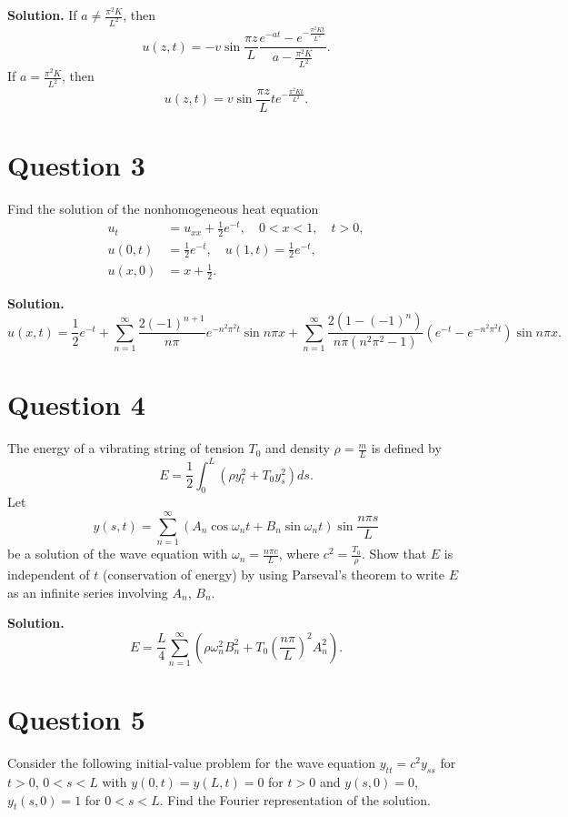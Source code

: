\documentclass[lang=en,11pt]{template}
\begin{document}
\textbf{Solution.} If $a \neq \frac{\pi^2 K}{L^2}$, then
\[
u(z,t) = -v \sin \frac{\pi z}{L} \frac{e^{-at} - e^{-\frac{\pi^2 K t}{L^2}}}{a - \frac{\pi^2 K}{L^2}}.
\]
If $a = \frac{\pi^2 K}{L^2}$, then
\[
u(z,t) = v \sin \frac{\pi z}{L} t e^{-\frac{\pi^2 K t}{L^2}}.
\]

\section*{Question 3}
Find the solution of the nonhomogeneous heat equation
\[
\begin{aligned}
u_t &= u_{xx} + \frac{1}{2} e^{-t}, \quad 0 < x < 1, \quad t > 0, \\
u(0,t) &= \frac{1}{2} e^{-t}, \quad u(1,t) = \frac{1}{2} e^{-t}, \\
u(x,0) &= x + \frac{1}{2}.
\end{aligned}
\]

\textbf{Solution.}
\[
u(x,t) = \frac{1}{2} e^{-t} + \sum_{n=1}^{\infty} \frac{2 (-1)^{n+1}}{n \pi} e^{-n^2 \pi^2 t} \sin n \pi x + \sum_{n=1}^{\infty} \frac{2 (1 - (-1)^n)}{n \pi (n^2 \pi^2 - 1)} \left( e^{-t} - e^{-n^2 \pi^2 t} \right) \sin n \pi x.
\]

\section*{Question 4}
The energy of a vibrating string of tension $T_0$ and density $\rho = \frac{m}{L}$ is defined by
\[
E = \frac{1}{2} \int_0^L \left( \rho y_t^2 + T_0 y_s^2 \right) ds.
\]
Let
\[
y(s,t) = \sum_{n=1}^{\infty} \left( A_n \cos \omega_n t + B_n \sin \omega_n t \right) \sin \frac{n \pi s}{L}
\]
be a solution of the wave equation with $\omega_n = \frac{n \pi c}{L}$, where $c^2 = \frac{T_0}{\rho}$. Show that $E$ is independent of $t$ (conservation of energy) by using Parseval’s theorem to write $E$ as an infinite series involving $A_n$, $B_n$.

\textbf{Solution.}
\[
E = \frac{L}{4} \sum_{n=1}^{\infty} \left( \rho \omega_n^2 B_n^2 + T_0 \left( \frac{n \pi}{L} \right)^2 A_n^2 \right).
\]

\section*{Question 5}
Consider the following initial-value problem for the wave equation $y_{tt} = c^2 y_{ss}$ for $t > 0$, $0 < s < L$ with $y(0,t) = y(L,t) = 0$ for $t > 0$ and $y(s,0) = 0$, $y_t(s,0) = 1$ for $0 < s < L$. Find the Fourier representation of the solution.
\end{document}
